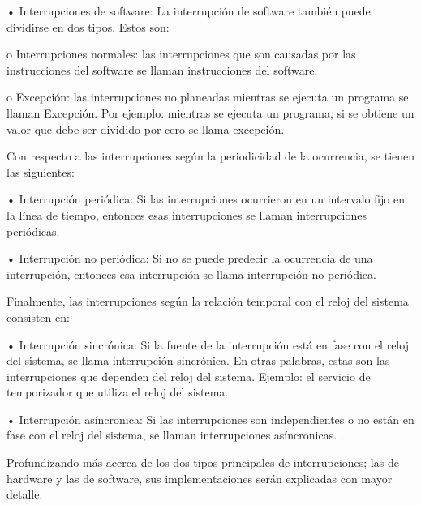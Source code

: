 \documentclass[12pt]{article}
\begin{document}
{•	Interrupciones de software: La interrupción de software también puede dividirse en dos tipos. Estos son:

\hspace{10mm}o	Interrupciones normales: las interrupciones que son causadas por las instrucciones del software se llaman instrucciones del software.
    
\hspace{10mm}o	Excepción: las interrupciones no planeadas mientras se ejecuta un programa se llaman Excepción. Por ejemplo: mientras se ejecuta un programa, si se obtiene un valor que debe ser dividido por cero se llama excepción.
\newline
    
Con respecto a las interrupciones según la periodicidad de la ocurrencia, se tienen las siguientes:
\newline

•	Interrupción periódica: Si las interrupciones ocurrieron en un intervalo fijo en la línea de tiempo, entonces esas interrupciones se llaman interrupciones periódicas.

•	Interrupción no periódica: Si no se puede predecir la ocurrencia de una interrupción, entonces esa interrupción se llama interrupción no periódica.
\newline

Finalmente, las interrupciones según la relación temporal con el reloj del sistema consisten en:
\newline

•	Interrupción sincrónica: Si la fuente de la interrupción está en fase con el reloj del sistema, se llama interrupción sincrónica. En otras palabras, estas son las interrupciones que dependen del reloj del sistema. Ejemplo: el servicio de temporizador que utiliza el reloj del sistema.

•	Interrupción asíncronica: Si las interrupciones son independientes o no están en fase con el reloj del sistema, se llaman interrupciones asíncronicas.   \citep{Tip}.
\newline

Profundizando más acerca de los dos tipos principales de interrupciones; las de hardware y las de software, sus implementaciones serán explicadas con mayor detalle. 
\newline

}
\end{document}
